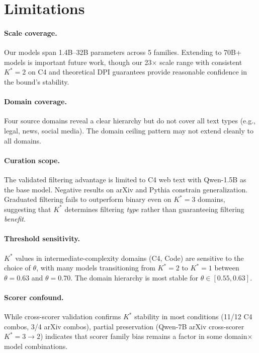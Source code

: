 \documentclass[11pt,a4paper]{article}
\begin{document}
\section{Limitations}\label{sec:limitations}

\paragraph{Scale coverage.} Our models span 1.4B--32B parameters across 5 families. Extending to 70B+ models is important future work, though our 23$\times$ scale range with consistent $K^*\!=\!2$ on C4 and theoretical DPI guarantees provide reasonable confidence in the bound's stability.

\paragraph{Domain coverage.} Four source domains reveal a clear hierarchy but do not cover all text types (e.g., legal, news, social media). The domain ceiling pattern may not extend cleanly to all domains.

\paragraph{Curation scope.} The validated filtering advantage is limited to C4 web text with Qwen-1.5B as the base model. Negative results on arXiv and Pythia constrain generalization. Graduated filtering fails to outperform binary even on $K^*\!=\!3$ domains, suggesting that $K^*$ determines filtering \emph{type} rather than guaranteeing filtering \emph{benefit}.

\paragraph{Threshold sensitivity.} $K^*$ values in intermediate-complexity domains (C4, Code) are sensitive to the choice of $\theta$, with many models transitioning from $K^*\!=\!2$ to $K^*\!=\!1$ between $\theta = 0.63$ and $\theta = 0.70$. The domain hierarchy is most stable for $\theta \in [0.55, 0.63]$.

\paragraph{Scorer confound.} While cross-scorer validation confirms $K^*$ stability in most conditions (11/12 C4 combos, 3/4 arXiv combos), partial preservation (Qwen-7B arXiv cross-scorer $K^*\!=\!3 \to 2$) indicates that scorer family bias remains a factor in some domain$\times$model combinations.
\end{document}
